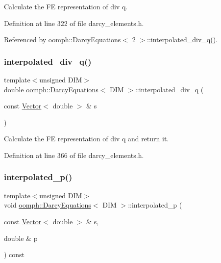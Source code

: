 Calculate the FE representation of div q. 



Definition at line 322 of file darcy\+\_\+elements.\+h.



Referenced by oomph\+::\+Darcy\+Equations$<$ 2 $>$\+::interpolated\+\_\+div\+\_\+q().

\mbox{\label{classoomph_1_1DarcyEquations_a1a01360c1c30124f862f85c411afa016}} 
\subsubsection{\texorpdfstring{interpolated\+\_\+div\+\_\+q()}{interpolated\_div\_q()}\hspace{0.1cm}{\footnotesize\ttfamily [2/2]}}
{\footnotesize\ttfamily template$<$unsigned D\+IM$>$ \\
double \hyperlink{classoomph_1_1DarcyEquations}{oomph\+::\+Darcy\+Equations}$<$ D\+IM $>$\+::interpolated\+\_\+div\+\_\+q (\begin{DoxyParamCaption}\item[{const \hyperlink{classoomph_1_1Vector}{Vector}$<$ double $>$ \&}]{s }\end{DoxyParamCaption})\hspace{0.3cm}{\ttfamily [inline]}}



Calculate the FE representation of div q and return it. 



Definition at line 366 of file darcy\+\_\+elements.\+h.

\mbox{\label{classoomph_1_1DarcyEquations_a800717c69f8a472d98ad0d9714a9598b}} 
\subsubsection{\texorpdfstring{interpolated\+\_\+p()}{interpolated\_p()}\hspace{0.1cm}{\footnotesize\ttfamily [1/2]}}
{\footnotesize\ttfamily template$<$unsigned D\+IM$>$ \\
void \hyperlink{classoomph_1_1DarcyEquations}{oomph\+::\+Darcy\+Equations}$<$ D\+IM $>$\+::interpolated\+\_\+p (\begin{DoxyParamCaption}\item[{const \hyperlink{classoomph_1_1Vector}{Vector}$<$ double $>$ \&}]{s,  }\item[{double \&}]{p }\end{DoxyParamCaption}) const\hspace{0.3cm}{\ttfamily [inline]}}



